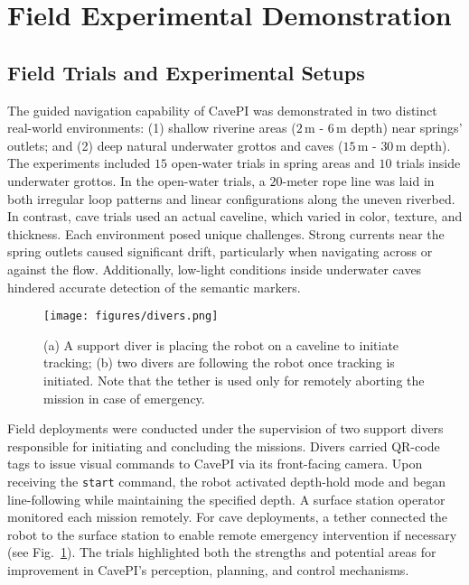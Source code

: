 
\vspace{1mm}
\section{Field Experimental Demonstration}
\subsection{Field Trials and Experimental Setups}
The guided navigation capability of CavePI was demonstrated in two distinct real-world environments: (1) shallow riverine areas ($2$\,m - $6$\,m depth) near springs' outlets; and (2) deep natural underwater grottos and caves ($15$\,m - $30$\,m depth).  
The experiments included $15$ open-water trials in spring areas and $10$ trials inside underwater grottos. In the open-water trials, a $20$-meter rope line was laid in both irregular loop patterns and linear configurations along the uneven riverbed. In contrast, cave trials used an actual caveline, which varied in color, texture, and thickness. Each environment posed unique challenges. Strong currents near the spring outlets caused significant drift, particularly when navigating across or against the flow. Additionally, low-light conditions inside underwater caves hindered accurate detection of the semantic markers.


\begin{figure}[b]
    \centering
    \texttt{[image: figures/divers.png]}%
    \vspace{-1mm}
    \caption{(a) A support diver is placing the robot on a caveline to initiate tracking; (b) two divers are following the robot once tracking is initiated. Note that the tether is used only for remotely aborting the mission in case of emergency.
    }%
    \label{fig:divers}
\end{figure}

Field deployments were conducted under the supervision of two support divers responsible for initiating and concluding the missions. Divers carried QR-code tags to issue visual commands to CavePI via its front-facing camera. Upon receiving the \texttt{start} command, the robot activated depth-hold mode and began line-following while maintaining the specified depth. A surface station operator monitored each mission remotely. For cave deployments, a tether connected the robot to the surface station to enable remote emergency intervention if necessary (see Fig.~\ref{fig:divers}). The trials highlighted both the strengths and potential areas for improvement in CavePI's perception, planning, and control mechanisms. 


